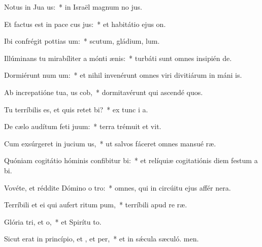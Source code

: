 \item Notus in Jua us:~* in Israël magnum no jus.
\item Et factus est in pace cus jus:~* et habitátio ejus  on.
\item Ibi confrégit pottias um:~* scutum, gládium,  lum.
\item Illúminans tu mirabíliter a mónti ænis:~* turbáti sunt omnes insipién de.
\item Dormiérunt num um:~* et nihil invenérunt omnes viri divitiárum in máni is.
\item Ab increpatióne tua, us cob,~* dormitavérunt qui ascendé quos.
\item Tu terríbilis es, et quis retet bi?~* ex tunc i a.
\item De cælo audítum feti juum:~* terra trémuit et vit.
\item Cum exsúrgeret in jucium us,~* ut salvos fáceret omnes mansué ræ.
\item Quóniam cogitátio hóminis confibitur bi:~* et relíquiæ cogitatiónis diem festum a bi.
\item Vovéte, et réddite Dómino o tro:~* omnes, qui in circúitu ejus affér nera.
\item Terríbili et ei qui aufert ritum pum,~* terríbili apud re ræ.
\item Glória tri, et o,~* et Spirítu to.
\item Sicut erat in princípio, et , et per,~* et in sǽcula sæculó. men.
